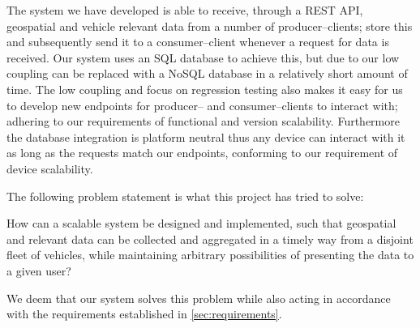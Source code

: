\bigskip
The system we have developed is able to receive, through a REST API, geospatial and vehicle relevant data from a number of producer--clients; store this and subsequently send it to a consumer--client whenever a request for data is received.
Our system uses an SQL database to achieve this, but due to our low coupling can be replaced with a NoSQL database in a relatively short amount of time.
The low coupling and focus on regression testing also makes it easy for us to develop new endpoints for producer-- and consumer--clients to interact with; adhering to our requirements of functional and version scalability.
Furthermore the database integration is platform neutral thus any device can interact with it as long as the requests match our endpoints, conforming to our requirement of device scalability.

The following problem statement is what this project has tried to solve:


\medskip
{\addtolength{\leftskip}{10mm}\addtolength{\rightskip}{10mm}\noindent\hrulefill\it

\noindent How can a scalable system be designed and implemented,
such that geospatial and relevant data can be collected and aggregated in a timely way from a disjoint fleet of vehicles,
while maintaining arbitrary possibilities of presenting the data to a given user?

\noindent\hrulefill

}

We deem that our system solves this problem while also acting in accordance with the requirements established in \cref{sec:requirements}.
